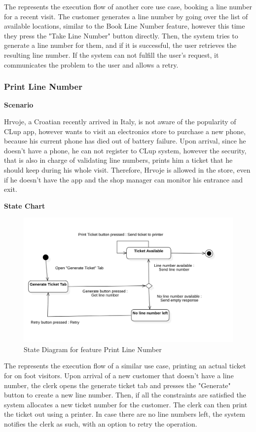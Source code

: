 The  represents the execution flow of another core use case, booking a line number for a recent visit.
The customer generates a line number by going over the list of available locations, similar to the Book Line Number feature, however this time they press the "Take Line Number" button directly.
Then, the system tries to generate a line number for them, and if it is successful, the user retrieves the resulting line number.
If the system can not fulfill the user's request, it communicates the problem to the user and allows a retry.

\subsubsection{Print Line Number}

\textbf{Scenario}

Hrvoje, a Croatian recently arrived in Italy, is not aware of the popularity of CLup app, however wants to visit an electronics store to purchase a new phone, because his current phone has died out of battery failure.
Upon arrival, since he doesn't have a phone, he can not register to CLup system, however the security, that is also in charge of validating line numbers, prints him a ticket that he should keep during his whole visit.
Therefore, Hrvoje is allowed in the store, even if he doesn't have the app and the shop manager can monitor his entrance and exit.

\textbf{State Chart}

\begin{figure}[H]
    \centering
    \includegraphics[height=0.4\textwidth]{Images/StateCharts/PrintTicket.png}
    \caption{State Diagram for feature Print Line Number}
    \label{fig:SDPrintLine}
\end{figure}

The  represents the execution flow of a similar use case, printing an actual ticket for on foot visitors.
Upon arrival of a new customer that doesn't have a line number, the clerk opens the generate ticket tab and presses the "Generate" button to create a new line number.
Then, if all the constraints are satisfied the system allocates a new ticket number for the customer.
The clerk can then print the ticket out using a printer.
In case there are no line numbers left, the system notifies the clerk as such, with an option to retry the operation.

